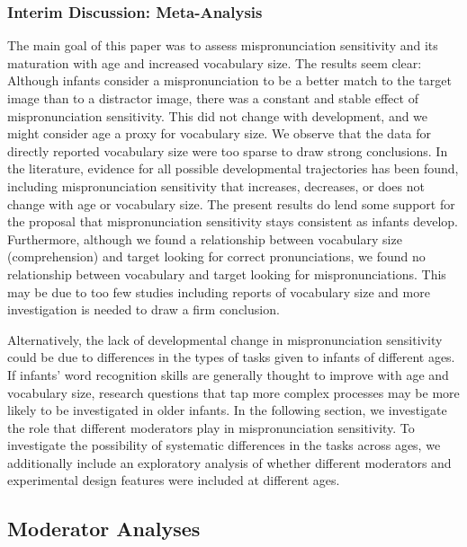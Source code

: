 \documentclass[man]{apa6}
\theoremstyle{definition}
\theoremstyle{definition}
\theoremstyle{definition}
\theoremstyle{remark}
\begin{document}
\subsubsection{Interim Discussion:
Meta-Analysis}\label{interim-discussion-meta-analysis}

The main goal of this paper was to assess mispronunciation sensitivity
and its maturation with age and increased vocabulary size. The results
seem clear: Although infants consider a mispronunciation to be a better
match to the target image than to a distractor image, there was a
constant and stable effect of mispronunciation sensitivity. This did not
change with development, and we might consider age a proxy for
vocabulary size. We observe that the data for directly reported
vocabulary size were too sparse to draw strong conclusions. In the
literature, evidence for all possible developmental trajectories has
been found, including mispronunciation sensitivity that increases,
decreases, or does not change with age or vocabulary size. The present
results do lend some support for the proposal that mispronunciation
sensitivity stays consistent as infants develop. Furthermore, although
we found a relationship between vocabulary size (comprehension) and
target looking for correct pronunciations, we found no relationship
between vocabulary and target looking for mispronunciations. This may be
due to too few studies including reports of vocabulary size and more
investigation is needed to draw a firm conclusion.

Alternatively, the lack of developmental change in mispronunciation
sensitivity could be due to differences in the types of tasks given to
infants of different ages. If infants' word recognition skills are
generally thought to improve with age and vocabulary size, research
questions that tap more complex processes may be more likely to be
investigated in older infants. In the following section, we investigate
the role that different moderators play in mispronunciation sensitivity.
To investigate the possibility of systematic differences in the tasks
across ages, we additionally include an exploratory analysis of whether
different moderators and experimental design features were included at
different ages.

\subsection{Moderator Analyses}\label{moderator-analyses}
\end{document}
